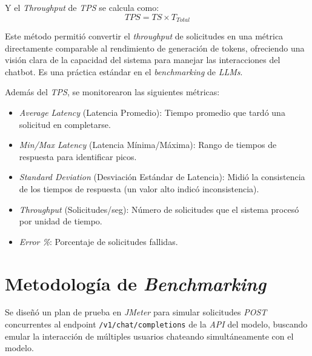 Y el \textit{Throughput} de \textit{TPS} se calcula como:
\begin{equation*}
TPS = TS \times T_{Total}
\end{equation*}

Este método permitió convertir el \textit{throughput} de solicitudes en una métrica directamente comparable al rendimiento de generación de tokens, ofreciendo una visión clara de la capacidad del sistema para manejar las interacciones del chatbot. Es una práctica estándar en el \textit{benchmarking} de \textit{LLMs}.

Además del \textit{TPS}, se monitorearon las siguientes métricas:
\begin{itemize}
    \item \textit{Average Latency} (Latencia Promedio): Tiempo promedio que tardó una solicitud en completarse.
    \item \textit{Min/Max Latency} (Latencia Mínima/Máxima): Rango de tiempos de respuesta para identificar picos.
    \item \textit{Standard Deviation} (Desviación Estándar de Latencia): Midió la consistencia de los tiempos de respuesta (un valor alto indicó inconsistencia).
    \item \textit{Throughput} (Solicitudes/seg): Número de solicitudes que el sistema procesó por unidad de tiempo.
    \item \textit{Error \%}: Porcentaje de solicitudes fallidas.
\end{itemize}

\section{Metodología de \textit{Benchmarking}}
Se diseñó un plan de prueba en \textit{JMeter} para simular solicitudes \textit{POST} concurrentes al endpoint \texttt{/v1/chat/completions} de la \textit{API} del modelo, buscando emular la interacción de múltiples usuarios chateando simultáneamente con el modelo.

